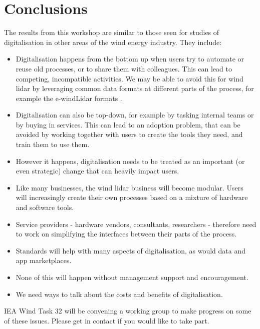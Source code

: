 \section{Conclusions}
The results from this workshop are similar to those seen for studies of digitalisation in other areas of the wind energy industry. They include:

\begin{itemize}
    \item
    Digitalisation happens from the bottom up when users try to automate or reuse old processes, or to share them with colleagues. This can lead to competing, incompatible activities. We may be able to avoid this for wind lidar by leveraging common data formats at different parts of the process, for example the e-windLidar formats \citep{nikola_vasiljevic_2018_2478051}.
    \item 
    Digitalisation can also be top-down, for example by tasking internal teams or by buying in services. This can lead to an adoption problem, that can be avoided by working together with users to create the tools they need, and train them to use them.
    \item
    However it happens, digitalisation needs to be treated as an important (or even strategic) change that can heavily impact users.
    \item
    Like many businesses, the wind lidar business will become modular. Users will increasingly create their own processes based on a mixture of hardware and software tools. 
    \item 
    Service providers - hardware vendors, consultants, researchers - therefore need to work on simplifying the interfaces between their parts of the process.
    \item
    Standards will help with many aspects of digitalisation, as would data and app marketplaces.
    \item
    None of this will happen without management support and encouragement.
    \item 
    We need ways to talk about the costs and benefits of digitalisation.
\end{itemize}

\begin{taskactions}
IEA Wind Task 32 will be convening a working group to make progress on some of these issues. Please get in contact if you would like to take part.
\end{taskactions}
